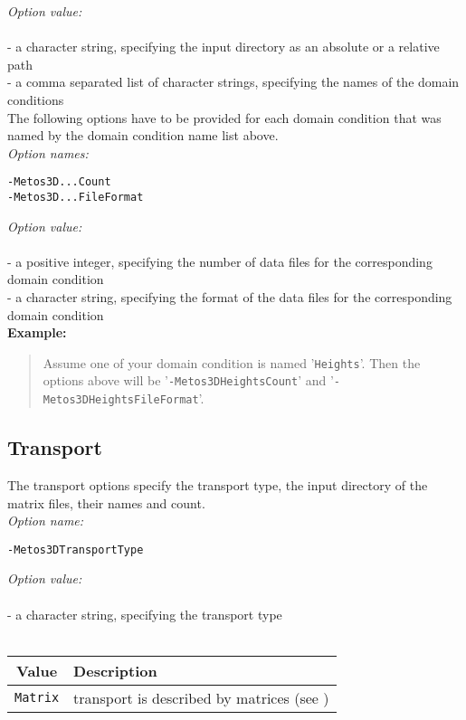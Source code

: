 \documentclass{article}
\begin{document}
\emph{Option value:} \\
\vspace{-0.3cm}\\
- a character string, specifying the input directory as an absolute or a relative path \\
- a comma separated list of character strings, specifying the names of the domain conditions \\

The following options have to be provided for each domain condition
that was named by the domain condition name list above. \\

\emph{Option names:}
\begin{verbatim}
-Metos3D...Count
-Metos3D...FileFormat
\end{verbatim}

\emph{Option value:} \\
\vspace{-0.3cm}\\
- a positive integer, specifying the number of data files for the corresponding domain condition \\
- a character string, specifying the format of the data files for the corresponding domain condition \\

\textbf{Example:}
\begin{quote}
Assume one of your domain condition is named '\texttt{Heights}'. Then the options
above will be '\texttt{-Metos3DHeightsCount}' and '\texttt{-Metos3DHeightsFileFormat}'.
\end{quote}

%
%
\subsection{Transport}

The transport options specify the transport type,
the input directory of the matrix files, their names and count. \\

\emph{Option name:}
\begin{verbatim}
-Metos3DTransportType                                
\end{verbatim}

\emph{Option value:} \\
\vspace{-0.3cm}\\
- a character string, specifying the transport type \\
\\
\begin{tabular}{c|l}
Value & Description \\ \hline
\texttt{Matrix} & transport is described by matrices (see \cite{KhViCa05})
\end{tabular} \\
\end{document}
